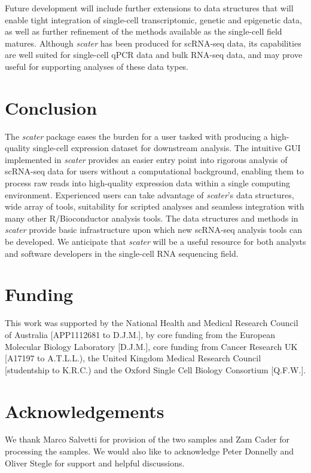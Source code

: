 \documentclass[10pt,letterpaper]{article}
\begin{document}
Future development will include further extensions to data structures that will enable tight integration of single-cell transcriptomic, genetic and epigenetic data, as well as further refinement of the methods available as the single-cell field matures. Although \emph{scater} has been produced for
scRNA-seq data, its capabilities are well suited for single-cell qPCR data
and bulk RNA-seq data, and may prove useful for supporting analyses of these data types.


\section*{Conclusion}\label{conclusion}

The \emph{scater} package eases the burden for a user tasked with
producing a high-quality single-cell expression dataset for downstream analysis. The intuitive GUI implemented in \emph{scater} provides an easier entry point into rigorous analysis of scRNA-seq data for users without a
computational background, enabling them to process raw reads into high-quality expression data within a single computing environment. Experienced users can take advantage of \emph{scater}'s data structures, wide array of tools, suitability for scripted analyses and seamless integration with many other R/Bioconductor analysis tools. The data structures and methods in
\emph{scater} provide basic infrastructure upon which new scRNA-seq
analysis tools can be developed. We anticipate that \emph{scater} will be a
useful resource for both analysts and software developers in the
single-cell RNA sequencing field.\vspace*{-10pt}


\section*{Funding}

This work was supported by the National Health and Medical Research Council of Australia [APP1112681 to D.J.M.], by core funding from the European Molecular Biology Laboratory [D.J.M.], core funding from Cancer Research UK [A17197 to A.T.L.L.), the United Kingdom Medical Research Council [studentship to K.R.C.) and the Oxford Single Cell Biology Consortium [Q.F.W.].\vspace*{-12pt}


\section*{Acknowledgements}\label{acknowledgements}

We thank Marco Salvetti for provision of the two samples and Zam Cader for processing the samples. We would also like to acknowledge Peter Donnelly and Oliver Stegle for support and helpful discussions.\vspace*{-12pt}


\nolinenumbers




\end{document}
